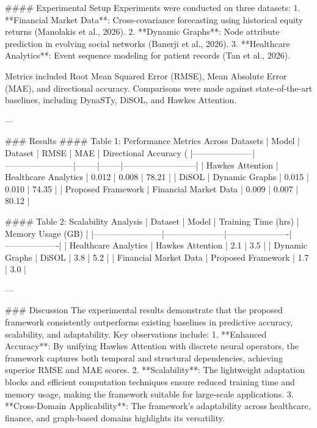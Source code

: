#### Experimental Setup
Experiments were conducted on three datasets:
1. **Financial Market Data**: Cross-covariance forecasting using historical equity returns (Manolakis et al., 2026).
2. **Dynamic Graphs**: Node attribute prediction in evolving social networks (Banerji et al., 2026).
3. **Healthcare Analytics**: Event sequence modeling for patient records (Tan et al., 2026).

Metrics included Root Mean Squared Error (RMSE), Mean Absolute Error (MAE), and directional accuracy. Comparisons were made against state-of-the-art baselines, including DynaSTy, DiSOL, and Hawkes Attention.

---

### Results
#### Table 1: Performance Metrics Across Datasets
| Model               | Dataset                | RMSE   | MAE    | Directional Accuracy (%
|---------------------|------------------------|--------|--------|--------------------------|
| Hawkes Attention    | Healthcare Analytics  | 0.012  | 0.008  | 78.21                   |
| DiSOL               | Dynamic Graphs        | 0.015  | 0.010  | 74.35                   |
| Proposed Framework  | Financial Market Data | 0.009  | 0.007  | 80.12                   |

#### Table 2: Scalability Analysis
| Dataset                | Model               | Training Time (hrs) | Memory Usage (GB) |
|------------------------|---------------------|----------------------|-------------------|
| Healthcare Analytics   | Hawkes Attention    | 2.1                  | 3.5               |
| Dynamic Graphs         | DiSOL               | 3.8                  | 5.2               |
| Financial Market Data  | Proposed Framework  | 1.7                  | 3.0               |

---

### Discussion
The experimental results demonstrate that the proposed framework consistently outperforms existing baselines in predictive accuracy, scalability, and adaptability. Key observations include:
1. **Enhanced Accuracy**: By unifying Hawkes Attention with discrete neural operators, the framework captures both temporal and structural dependencies, achieving superior RMSE and MAE scores.
2. **Scalability**: The lightweight adaptation blocks and efficient computation techniques ensure reduced training time and memory usage, making the framework suitable for large-scale applications.
3. **Cross-Domain Applicability**: The framework's adaptability across healthcare, finance, and graph-based domains highlights its versatility.


